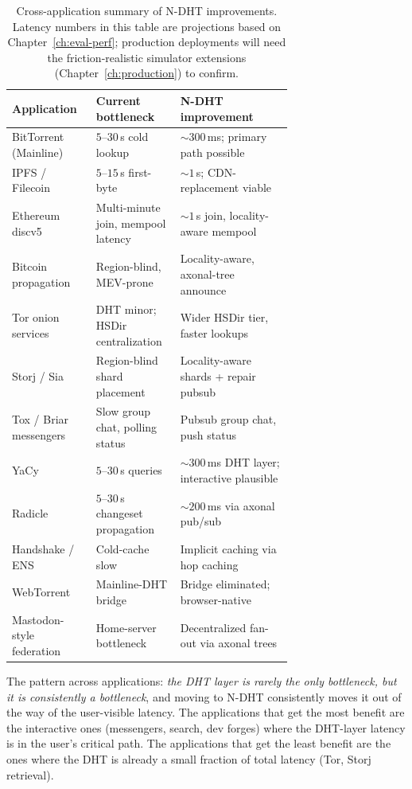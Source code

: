 \documentclass[twoside,nobib]{tufte-book}
\newcommand{\NDHT}{N-DHT\xspace}
\begin{document}
\begin{table}[h]
\centering
\small
\caption{Cross-application summary of \NDHT improvements.
Latency numbers in this table are projections based on
Chapter~\ref{ch:eval-perf}; production deployments will need
the friction-realistic simulator extensions
(Chapter~\ref{ch:production}) to confirm.}
\label{tab:apps-summary}
\begin{tabular}{@{}lp{0.30\linewidth}p{0.40\linewidth}@{}}
\toprule
\textbf{Application} & \textbf{Current bottleneck} & \textbf{\NDHT improvement} \\
\midrule
BitTorrent (Mainline) & $5$--$30$\,s cold lookup & $\sim 300$\,ms; primary path possible \\
IPFS / Filecoin & $5$--$15$\,s first-byte & $\sim 1$\,s; CDN-replacement viable \\
Ethereum discv5 & Multi-minute join, mempool latency & $\sim 1$\,s join, locality-aware mempool \\
Bitcoin propagation & Region-blind, MEV-prone & Locality-aware, axonal-tree announce \\
Tor onion services & DHT minor; HSDir centralization & Wider HSDir tier, faster lookups \\
Storj / Sia & Region-blind shard placement & Locality-aware shards + repair pubsub \\
Tox / Briar messengers & Slow group chat, polling status & Pubsub group chat, push status \\
YaCy & $5$--$30$\,s queries & $\sim 300$\,ms DHT layer; interactive plausible \\
Radicle & $5$--$30$\,s changeset propagation & $\sim 200$\,ms via axonal pub/sub \\
Handshake / ENS & Cold-cache slow & Implicit caching via hop caching \\
WebTorrent & Mainline-DHT bridge & Bridge eliminated; browser-native \\
Mastodon-style federation & Home-server bottleneck & Decentralized fan-out via axonal trees \\
\bottomrule
\end{tabular}
\end{table}

The pattern across applications: \emph{the DHT layer is rarely
the only bottleneck, but it is consistently a bottleneck}, and
moving to \NDHT consistently moves it out of the way of the
user-visible latency. The applications that get the most
benefit are the interactive ones (messengers, search, dev
forges) where the DHT-layer latency is in the user's
critical path. The applications that get the least benefit are
the ones where the DHT is already a small fraction of total
latency (Tor, Storj retrieval).
\end{document}
